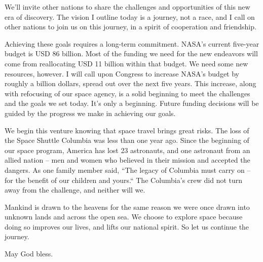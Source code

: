 \documentclass[11pt,a4paper]{article}
\begin{document}
We’ll invite other nations to share the challenges and opportunities of this new era of discovery. The vision I outline today is a journey, not a race, and I call on other nations to join us on this journey, in a spirit of cooperation and friendship.

Achieving these goals requires a long-term commitment. NASA’s current five-year budget is USD 86 billion. Most of the funding we need for the new endeavors will come from reallocating USD 11 billion within that budget. We need some new resources, however. I will call upon Congress to increase NASA’s budget by roughly a billion dollars, spread out over the next five years. This increase, along with refocusing of our space agency, is a solid beginning to meet the challenges and the goals we set today. It’s only a beginning. Future funding decisions will be guided by the progress we make in achieving our goals.

We begin this venture knowing that space travel brings great risks. The loss of the Space Shuttle Columbia was less than one year ago. Since the beginning of our space program, America has lost 23 astronauts, and one astronaut from an allied nation – men and women who believed in their mission and accepted the dangers. As one family member said, “The legacy of Columbia must carry on – for the benefit of our children and yours.“ The Columbia’s crew did not turn away from the challenge, and neither will we.

Mankind is drawn to the heavens for the same reason we were once drawn into unknown lands and across the open sea. We choose to explore space because doing so improves our lives, and lifts our national spirit. So let us continue the journey.

May God bless.
\end{document}
